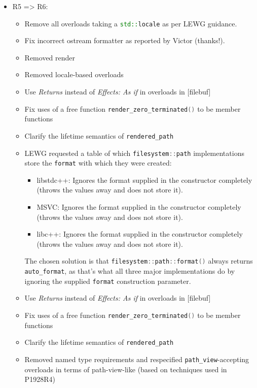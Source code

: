 \documentclass[11pt]{article}
\newcommand{\code}[2][cpp]{\lstinline[language=#1,basicstyle=\small\ttfamily]{#2}}
\begin{document}
\begin{itemize}
    \item R5 => R6:
    \begin{itemize}
    \item Remove all overloads taking a \code{std::locale} as per LEWG guidance.
    \item Fix incorrect ostream formatter as reported by Victor (thanks^^21). 
    \item Removed render
    \item Removed locale-based overloads
    \item Use \emph{Returns} instead of \emph{Effects: As if} in overloads in [filebuf]
    \item Fix uses of a free function \code{render_zero_terminated()} to be member functions
    \item Clarify the lifetime semantics of \code{rendered_path}
    \item LEWG requested a table of which \code{filesystem::path} implementations store
    the \code{format} with which they were created:
    \begin{itemize}
      \item libstdc++: Ignores the format supplied in the constructor completely
      (throws the values away and does not store it).\\
      \item MSVC: Ignores the format supplied in the constructor completely
      (throws the values away and does not store it).\\
      \item libc++: Ignores the format supplied in the constructor completely
      (throws the values away and does not store it).\\
    \end{itemize}
    The chosen solution is that \code{filesystem::path::format()} always
    returns \code{auto_format}, as that's what all three major implementations
    do by ignoring the supplied \code{format} construction parameter.
    \item Use \emph{Returns} instead of \emph{Effects: As if} in overloads in [filebuf]
    \item Fix uses of a free function \code{render_zero_terminated()} to be member functions
    \item Clarify the lifetime semantics of \code{rendered_path}
    \item Removed named type requirements and respecified \code{path_view}-accepting overloads in terms of path-view-like (based on techniques used in P1928R4)

\end{itemize}
\end{itemize}
\end{document}
